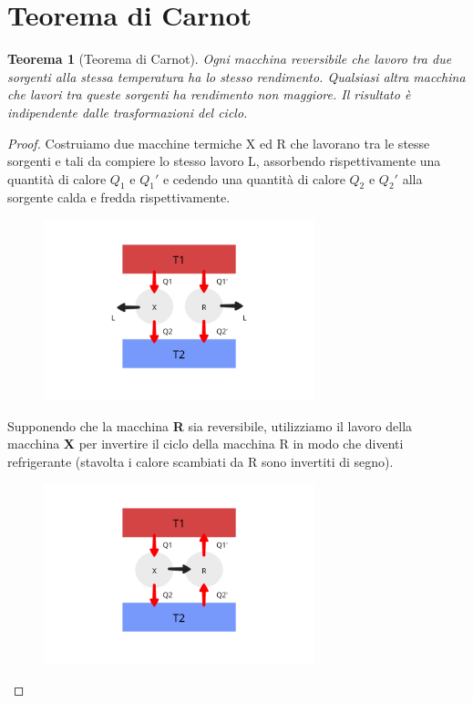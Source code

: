 \documentclass{article}
\newtheorem{thm}{Teorema}[section]
\begin{document}
\section{Teorema di Carnot}
\begin{thm}[Teorema di Carnot]
Ogni macchina reversibile che lavoro tra due sorgenti alla stessa temperatura ha lo stesso rendimento. Qualsiasi altra macchina che lavori tra queste sorgenti ha rendimento non maggiore. Il risultato è indipendente dalle trasformazioni del ciclo. 
\end{thm}
\begin{proof}
Costruiamo due macchine termiche X ed R che lavorano tra le stesse sorgenti e tali da compiere lo stesso lavoro L, assorbendo rispettivamente una quantità di calore $Q_1$ e $Q_1'$ e cedendo una quantità di calore $Q_2$ e $Q_2'$ alla sorgente calda e fredda rispettivamente. 
\begin{figure}[H]
    \centering
    \includegraphics[width=0.7\textwidth]{TeoremaCarnot1.png}
    \label{TeoremaCarnot1}
\end{figure}
Supponendo che la macchina \textbf{R} sia reversibile, utilizziamo il lavoro della macchina \textbf{X} per invertire il ciclo della macchina R in modo che diventi refrigerante (stavolta i calore scambiati da R sono invertiti di segno).
\begin{figure}[H]
    \centering
    \includegraphics[width=0.7\textwidth]{TeoremaCarnot2.png}
    \label{TeoremaCarnot2}
\end{figure}


\end{proof}
\end{document}
